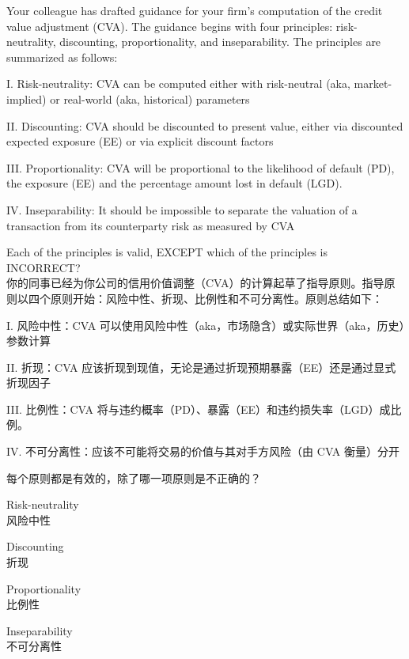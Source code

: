 \documentclass{article}
\newcounter{question} %
\begin{document}
\begin{question}
    Your colleague has drafted guidance for your firm’s computation of the credit value adjustment (CVA). The guidance begins with four principles: risk-neutrality, discounting, proportionality, and inseparability. The principles are summarized as follows:

    I. Risk-neutrality: CVA can be computed either with risk-neutral (aka, market-implied) or real-world (aka, historical) parameters

    II. Discounting: CVA should be discounted to present value, either via discounted expected exposure (EE) or via explicit discount factors

    III. Proportionality: CVA will be proportional to the likelihood of default (PD), the exposure (EE) and the percentage amount lost in default (LGD).

    IV. Inseparability: It should be impossible to separate the valuation of a transaction from its counterparty risk as measured by CVA

    Each of the principles is valid, EXCEPT which of the principles is INCORRECT?\\
    你的同事已经为你公司的信用价值调整（CVA）的计算起草了指导原则。指导原则以四个原则开始：风险中性、折现、比例性和不可分离性。原则总结如下：

    I. 风险中性：CVA 可以使用风险中性（aka，市场隐含）或实际世界（aka，历史）参数计算

    II. 折现：CVA 应该折现到现值，无论是通过折现预期暴露（EE）还是通过显式折现因子

    III. 比例性：CVA 将与违约概率（PD）、暴露（EE）和违约损失率（LGD）成比例。

    IV. 不可分离性：应该不可能将交易的价值与其对手方风险（由 CVA 衡量）分开

    每个原则都是有效的，除了哪一项原则是不正确的？
\end{question}

\begin{choices}
    \item Risk-neutrality\\
    风险中性
    \item Discounting\\
    折现
    \item Proportionality\\
    比例性
    \item Inseparability\\
    不可分离性
\end{choices}
\end{document}
